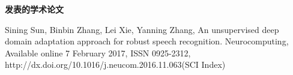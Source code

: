 
{}

\setlength{\parindent}{0em}
\textbf{发表的学术论文}
\begin{publist}
  \item Sining Sun, Binbin Zhang, Lei Xie, Yanning Zhang, An unsupervised deep domain adaptation approach for robust speech recognition. 
        Neurocomputing, Available online 7 February 2017, ISSN 0925-2312, http://dx.doi.org/10.1016/j.neucom.2016.11.063(SCI Index)
\end{publist}
\vspace{1cm}

